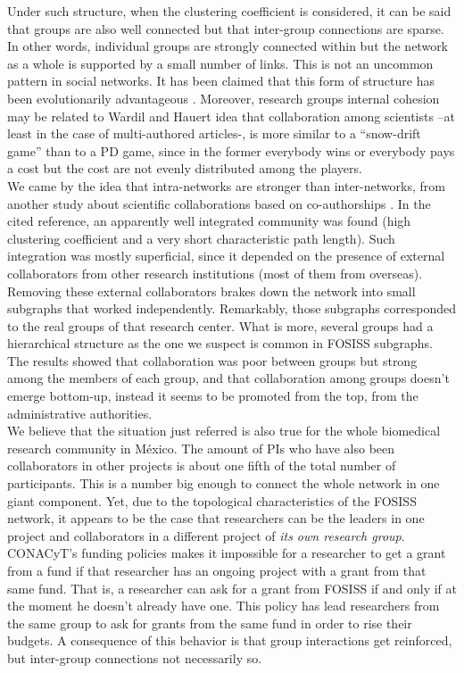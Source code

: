 \documentclass{bmcart}
\begin{document}
Under such structure, when the clustering coefficient is considered, it can be
said that groups are also well connected but that inter-group connections are
sparse. In other words, individual groups are strongly connected within but the
network as a whole is supported by a small number of links. {\color{red}This is
  not an uncommon pattern in social networks. It has been claimed that this form
  of structure has been evolutionarily advantageous
  \cite{Turchin:2015}. Moreover, research groups internal cohesion may be
related to Wardil and Hauert idea that collaboration among scientists --at least
in the case of multi-authored articles-, is more similar to a ``snow-drift
game'' than to a PD game, since in the former everybody wins or everybody pays a
cost but the cost are not evenly distributed among the players.}\\

We came by the idea that intra-networks are stronger than inter-networks, from
another study about scientific collaborations based on co-authorships 
\cite{HernandezLemus:2013}. In the cited reference, an apparently well
integrated community was found (high clustering coefficient and a very short
characteristic path length). Such integration was mostly superficial, since it
depended on the presence of external collaborators from other research
institutions (most of them from overseas).  Removing these external
collaborators brakes down the network into small subgraphs that worked
independently. Remarkably, those subgraphs corresponded to the real groups of
that research center.  What is more, several groups had a hierarchical structure
as the one we suspect is common in FOSISS subgraphs. The results showed that
collaboration was poor between groups but strong among the members of each
group, and that collaboration among groups doesn't emerge bottom-up, instead it
seems to be promoted from the top, from the administrative
authorities.\\

We believe that the situation just referred is also true for the whole
biomedical research community in M\'exico. The amount of PIs who have also been
collaborators in other projects is about one fifth of the total number of
participants.  This is a number big enough to connect the whole network in one
giant component. Yet, due to the topological characteristics of the FOSISS
network, it appears to be the case that researchers can be the leaders in one
project and collaborators in a different project of \emph{its own research
  group}. CONACyT's funding policies makes it impossible for a researcher to get
a grant from a fund if that researcher has an ongoing project with a grant from
that same fund. That is, a researcher can ask for a grant from FOSISS if and
only if at the moment he doesn't already have one.  This policy has lead
researchers from the same group to ask for grants from the same fund in order to
rise their budgets. A consequence of this behavior is that group interactions
get reinforced, but inter-group connections not necessarily so.\\
\end{document}
